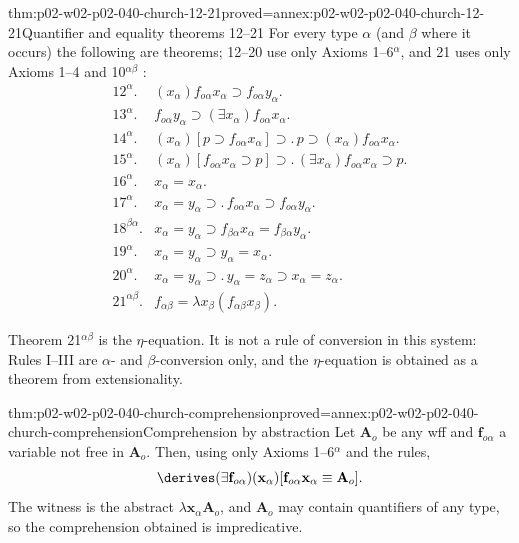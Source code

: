 \begin{hblemma}{thm:p02-w02-p02-040-church-12-21}{proved=annex:p02-w02-p02-040-church-12-21}{Quantifier and equality theorems 12--21}
For every type \(\alpha\) (and \(\beta\) where it occurs) the following are
theorems; 12--20 use only Axioms 1--6\(^\alpha\), and 21 uses only
Axioms 1--4 and 10\(^{\alpha\beta}\) \cite[\S5, p.~63]{Church1940}:
\[
\begin{array}{rl}
 12^\alpha. & (x_\alpha)f_{o\alpha}x_\alpha\supset f_{o\alpha}y_\alpha.\\
 13^\alpha. & f_{o\alpha}y_\alpha\supset(\exists x_\alpha)f_{o\alpha}x_\alpha.\\
 14^\alpha. & (x_\alpha)[p\supset f_{o\alpha}x_\alpha]\supset.\,p\supset(x_\alpha)f_{o\alpha}x_\alpha.\\
 15^\alpha. & (x_\alpha)[f_{o\alpha}x_\alpha\supset p]\supset.\,(\exists x_\alpha)f_{o\alpha}x_\alpha\supset p.\\
 16^\alpha. & x_\alpha=x_\alpha.\\
 17^\alpha. & x_\alpha=y_\alpha\supset.\,f_{o\alpha}x_\alpha\supset f_{o\alpha}y_\alpha.\\
 18^{\beta\alpha}. & x_\alpha=y_\alpha\supset f_{\beta\alpha}x_\alpha=f_{\beta\alpha}y_\alpha.\\
 19^\alpha. & x_\alpha=y_\alpha\supset y_\alpha=x_\alpha.\\
 20^\alpha. & x_\alpha=y_\alpha\supset.\,y_\alpha=z_\alpha\supset x_\alpha=z_\alpha.\\
 21^{\alpha\beta}. & f_{\alpha\beta}=\lambda x_\beta(f_{\alpha\beta}x_\beta).
\end{array}
\]
\end{hblemma}

Theorem 21\(^{\alpha\beta}\) is the \(\eta\)-equation.  It is not a rule of
conversion in this system: Rules I--III are \(\alpha\)- and
\(\beta\)-conversion only, and the \(\eta\)-equation is obtained as a
theorem from extensionality.

\begin{hbtheorem}{thm:p02-w02-p02-040-church-comprehension}{proved=annex:p02-w02-p02-040-church-comprehension}{Comprehension by abstraction}
Let \(\mathbf A_o\) be any wff and \(\mathbf f_{o\alpha}\) a variable not
free in \(\mathbf A_o\).  Then, using only Axioms 1--6\(^\alpha\) and the
rules,
\[
 \derives(\exists\mathbf f_{o\alpha})(\mathbf x_\alpha)
 [\mathbf f_{o\alpha}\mathbf x_\alpha\equiv\mathbf A_o].
\]
The witness is the abstract \(\lambda\mathbf x_\alpha\mathbf A_o\), and
\(\mathbf A_o\) may contain quantifiers of any type, so the comprehension
obtained is impredicative.
\end{hbtheorem}

